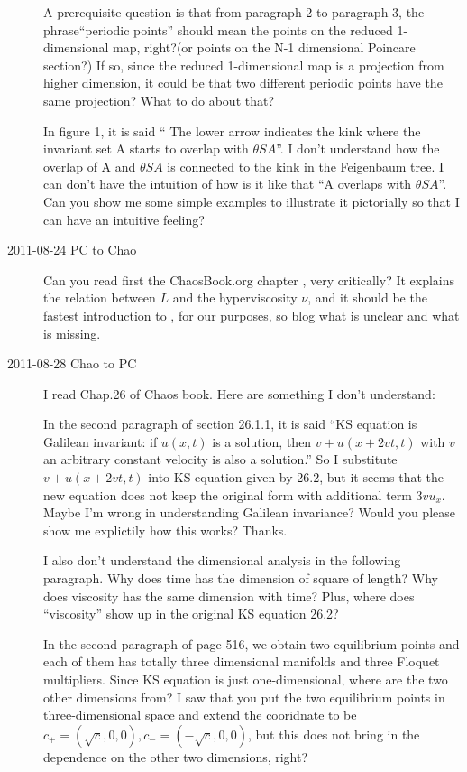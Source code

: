 \begin{description}
A prerequisite question is that from paragraph 2 to paragraph 3, the phrase``periodic points'' should mean the points on the reduced 1-dimensional map, right?(or points on the N-1 dimensional Poincare section?) If so, since the reduced 1-dimensional map is a projection from higher dimension, it could be that two different periodic points have the same projection? What to do about that? 


In figure 1, it is said `` The lower arrow indicates the kink where the invariant set A starts to overlap with $\theta SA$''. I don't understand how the overlap of A and $\theta SA$ is connected to the kink in the Feigenbaum tree. I can don't have the intuition of how is it like that ``A overlaps with $\theta SA$''. Can you show me some simple examples to illustrate it pictorially so that I can have an intuitive feeling?

 


\item[2011-08-24 PC to Chao] Can you read first the ChaosBook.org chapter , very critically?
It explains the relation between $L$ and the hyperviscosity $\nu$, and
it should be the fastest introduction to \KSe, for our purposes, so
blog what is unclear and what is missing.

\item[2011-08-28 Chao to PC] I read Chap.26 of Chaos book. 
Here are something I don't understand:

In the second paragraph of section 26.1.1, it is said ``KS equation is Galilean invariant: if $u(x,t)$ is a solution, then $v+u(x+2vt,t)$ with $v$ an arbitrary constant velocity is also a solution.'' So I substitute $v+u(x+2vt,t)$ into KS equation given by 26.2, but it seems that the new equation does not keep the original form with additional term $3vu_x$. Maybe I'm wrong in understanding Galilean invariance? Would you please show me explictily how this works? Thanks.

I also don't understand the dimensional analysis in the following paragraph. Why does time has the dimension of square of length? Why does viscosity has the same dimension with time? Plus, where does ``viscosity'' show up in the original KS equation 26.2?

In the second paragraph of page 516, we obtain two equilibrium points and each of them has totally three dimensional manifolds and three Floquet multipliers. Since KS equation is just one-dimensional, where are the two other dimensions from? I saw that you put the two equilibrium points in three-dimensional space and extend the cooridnate to be $c_+ = (\sqrt{c},0,0),c_- = (-\sqrt{c},0,0)$, but this does not bring in the dependence on the other two dimensions, right?
 

\end{description}
